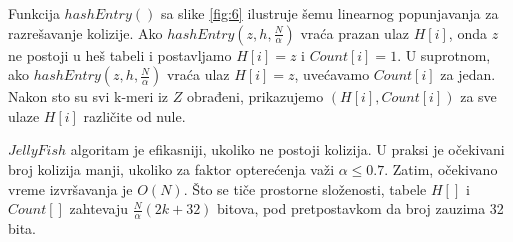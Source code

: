 \documentclass[12pt,oneside]{memoir}
\begin{document}
Funkcija $hashEntry()$ sa slike \ref{fig:6} ilustruje šemu linearnog popunjavanja za razrešavanje kolizije. Ako $hashEntry(z, h, \frac{N}{\alpha})$ vraća prazan ulaz $H[i]$, onda $z$ ne postoji u heš tabeli i postavljamo $H[i] = z$ i $Count[i] = 1$. U suprotnom, ako $hashEntry(z, h, \frac{N}{\alpha})$ vraća ulaz $H[i] = z$, uvećavamo $Count[i]$ za jedan. Nakon sto su svi k-meri iz $Z$ obrađeni, prikazujemo $(H[i], Count[i])$ za sve ulaze $H[i]$ različite od nule.

\begin{comment}

\begin{figure}[!ht]
  \centering
  \texttt{[image: 58\_3algoritma.PNG]}
  \caption{Razmatra se skup 4-mera $Z = \{AC; CG; AC; GT; CA; GG; AC; GT\}$: (a) Ilustruje jednostavan metod za brojanje k-mera koji koristi \textit{Count} tabelu veličine 4k. (b) Ilustruje \textit{JellyFish} metod brojanja k-mera koja koristi heš tabelu veličine 7. Heš funkcija je $h(z) = b(z)$ \textit{mod} $7$. Na primer, $GT$ se čuva u tabeli $Count$ sa indeksom 4, jer je $h(GT) = 4$. U ovom primeru se javlja jedna kolizija. Pošto je i $h(CA) = 4$, $CA$ je u koliziji sa $GT$. Linearnim isprobavanjem $CA$ se ipak čuva u tabeli $Count$ sa indeksom 5. (c) Ilustruje DSK metod brojanja k-mera.
Pretpostavka je da je $h(z) = b(z)$, $n_{list} = 2$ i $n_{sublist} = 2$. DSK deli Z u
4 ($= n_{list} * n_{sublist}$) podliste, a zatim pokreće \textit{JellyFish} algoritam za brojanje k-mera u svakoj podlisti.}
  \label{fig:5}
  \source{\cite{WingKinSung} str. 131, slika 5.8}
\end{figure}

Slika \ref{fig:5}(b) daje primer koji ilustruje $JellyFish$ algoritam. 
\end{comment}

$JellyFish$ algoritam je efikasniji, ukoliko ne postoji kolizija. U praksi je očekivani broj kolizija manji, ukoliko za faktor opterećenja važi $\alpha \leq 0.7$. Zatim, očekivano vreme izvršavanja je $O(N)$. Što se tiče prostorne složenosti, tabele $H[]$ i $Count[]$ zahtevaju $\frac{N}{\alpha}(2k + 32)$ bitova, pod pretpostavkom da broj zauzima 32 bita.
\end{document}
